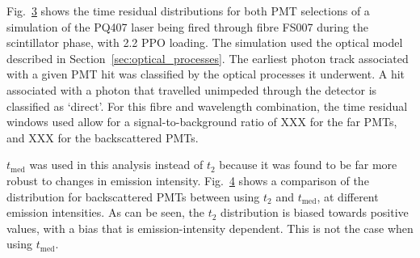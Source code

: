 Fig.~\ref{fig:smellie_extlength_PMT_selections} shows the time residual distributions for both PMT selections of a simulation of the PQ407 laser being fired through fibre FS007 during the scintillator phase, with \SI{2.2}{\gpl} PPO loading. The simulation used the optical model described in Section~\ref{sec:optical_processes}. The earliest photon track associated with a given PMT hit was classified by the optical processes it underwent. A hit associated with a photon that travelled unimpeded through the detector is classified as `direct'. For this fibre and wavelength combination, the time residual windows used allow for a signal-to-background ratio of XXX for the far PMTs, and XXX for the backscattered PMTs. %

\begin{figure}
    \centering
    \begin{subfigure}{0.98\textwidth}
        \centering
        \caption{}
        \label{fig:smellie_far_PMT_selection}
    \end{subfigure}
    \begin{subfigure}{0.98\textwidth}
        \centering
        \caption{}
        \label{fig:smellie_backscat_PMT_selection}
    \end{subfigure}
    \caption[]{}
    \label{fig:smellie_extlength_PMT_selections}
\end{figure}

$t_{\mathrm{med}}$ was used in this analysis instead of $t_{2}$ because it was found to be far more robust to changes in emission intensity. Fig.~\ref{fig:t2_temm_comparison} shows a comparison of the \tres{} distribution for backscattered PMTs between using $t_{2}$ and $t_{\mathrm{med}}$, at different emission intensities. As can be seen, the $t_{2}$ distribution is biased towards positive \tres{} values, with a bias that is emission-intensity dependent. This is not the case when using $t_{\mathrm{med}}$. 

\begin{figure}
    \centering
    \caption[]{}
    \label{fig:t2_temm_comparison}
\end{figure}


